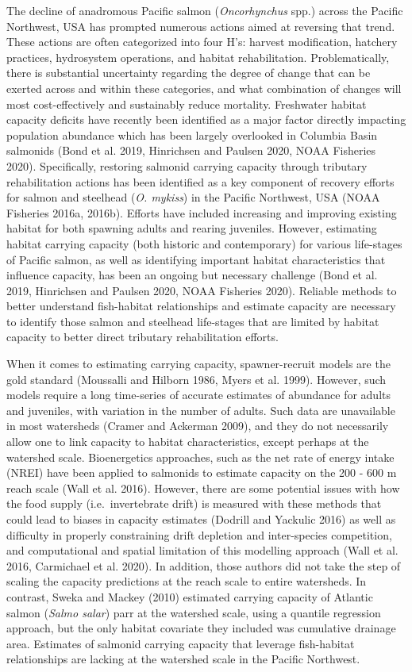 \documentclass[
  12pt,
]{article}
\begin{document}
The decline of anadromous Pacific salmon (\emph{Oncorhynchus} spp.) across the Pacific Northwest, USA has prompted numerous actions aimed at reversing that trend. These actions are often categorized into four H's: harvest modification, hatchery practices, hydrosystem operations, and habitat rehabilitation. Problematically, there is substantial uncertainty regarding the degree of change that can be exerted across and within these categories, and what combination of changes will most cost-effectively and sustainably reduce mortality. Freshwater habitat capacity deficits have recently been identified as a major factor directly impacting population abundance which has been largely overlooked in Columbia Basin salmonids (Bond et al. 2019, Hinrichsen and Paulsen 2020, NOAA Fisheries 2020). Specifically, restoring salmonid carrying capacity through tributary rehabilitation actions has been identified as a key component of recovery efforts for salmon and steelhead (\emph{O. mykiss}) in the Pacific Northwest, USA (NOAA Fisheries 2016a, 2016b). Efforts have included increasing and improving existing habitat for both spawning adults and rearing juveniles. However, estimating habitat carrying capacity (both historic and contemporary) for various life-stages of Pacific salmon, as well as identifying important habitat characteristics that influence capacity, has been an ongoing but necessary challenge (Bond et al. 2019, Hinrichsen and Paulsen 2020, NOAA Fisheries 2020). Reliable methods to better understand fish-habitat relationships and estimate capacity are necessary to identify those salmon and steelhead life-stages that are limited by habitat capacity to better direct tributary rehabilitation efforts.

When it comes to estimating carrying capacity, spawner-recruit models are the gold standard (Moussalli and Hilborn 1986, Myers et al. 1999). However, such models require a long time-series of accurate estimates of abundance for adults and juveniles, with variation in the number of adults. Such data are unavailable in most watersheds (Cramer and Ackerman 2009), and they do not necessarily allow one to link capacity to habitat characteristics, except perhaps at the watershed scale. Bioenergetics approaches, such as the net rate of energy intake (NREI) have been applied to salmonids to estimate capacity on the 200 - 600 m reach scale (Wall et al. 2016). However, there are some potential issues with how the food supply (i.e.~invertebrate drift) is measured with these methods that could lead to biases in capacity estimates (Dodrill and Yackulic 2016) as well as difficulty in properly constraining drift depletion and inter-species competition, and computational and spatial limitation of this modelling approach (Wall et al. 2016, Carmichael et al. 2020). In addition, those authors did not take the step of scaling the capacity predictions at the reach scale to entire watersheds. In contrast, Sweka and Mackey (2010) estimated carrying capacity of Atlantic salmon (\emph{Salmo salar}) parr at the watershed scale, using a quantile regression approach, but the only habitat covariate they included was cumulative drainage area. Estimates of salmonid carrying capacity that leverage fish-habitat relationships are lacking at the watershed scale in the Pacific Northwest.
\end{document}
